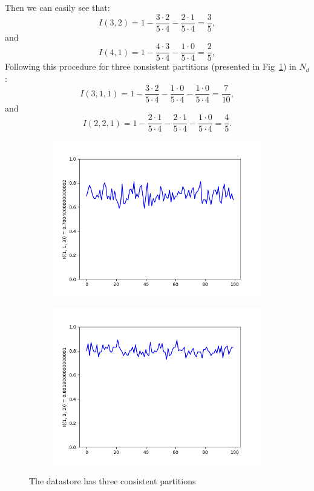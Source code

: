 \documentclass[a4paper,14pt]{llncs}
\begin{document}
Then we can easily see that:
\[
	I(3,2) = 1 - \frac{3 \cdot 2}{5 \cdot 4} - \frac{2 \cdot 1}{5 \cdot 4} = \frac{3}{5} ,
\]
and
\[
	I(4,1) = 1 - \frac{4 \cdot 3}{5 \cdot 4} - \frac{1 \cdot 0}{5 \cdot 4} = \frac{2}{5} ,
\]
Following this procedure for three consistent partitions (presented in 
Fig~\ref{pic:three_parts}) in $N_d$:
\[
	I(3,1,1) = 1 - \frac{3 \cdot 2}{5 \cdot 4} - \frac{1 \cdot 0}{5 \cdot 4} - \frac{1 \cdot 0}{5 \cdot 4} = \frac{7}{10} ,
\]
and 
\[
	I(2,2,1) = 1 - \frac{2 \cdot 1}{5 \cdot 4} - \frac{2 \cdot 1}{5  \cdot 4} - \frac{1 \cdot 0}{5 \cdot 4} = \frac{4}{5} .
\]

\begin{figure}[p]
\begin{subfigure}{0.5\linewidth}
\centering\includegraphics[scale=0.4]{images/1-1-3-consistent-partitions-probability.png}
\end{subfigure}
\begin{subfigure}{0.5\linewidth}
\centering\includegraphics[scale=0.4]{images/1-2-2-consistent-partitions-probability.png}
\end{subfigure}
\caption{The datastore has three consistent partitions}\label{pic:three_parts}
\end{figure}
\end{document}
